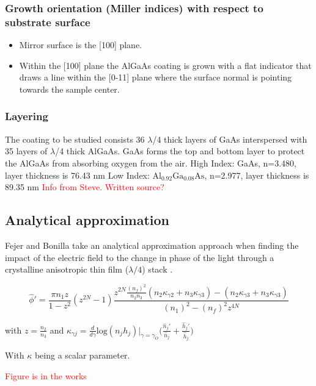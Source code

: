\subsubsection{Growth orientation (Miller indices) with respect to substrate surface}
\begin{itemize}
\item Mirror surface is the [100] plane.
\item Within the [100] plane the AlGaAs coating is grown with a flat indicator that draws a line within the [0-11] plane where the surface normal is pointing towards the sample center.
\end{itemize}


\subsubsection{Layering}
The coating to be studied consists 36 $\lambda$/4  thick layers of GaAs interspersed with 35 layers of $\lambda$/4 thick AlGaAs.   GaAs forms the top and bottom layer to protect the AlGaAs from absorbing oxygen from the air.
High Index:  GaAs, n=3.480, layer thickness is 76.43 nm
Low Index:  $ \mathrm{Al}_{0.92} \mathrm{Ga}_{0.08} \mathrm{As} $, n=2.977, layer thickness is 89.35 nm
\textcolor{red}{Info from Steve. Written source?}


\subsection{Analytical approximation}
Fejer and Bonilla take an analytical approximation approach when finding the impact of the electric field to the change in phase of the light through a crystalline anisotropic thin film ($\lambda/4$) stack \cite{bonilla_fejer}.

\begin{equation}
\hat{\phi}' = \frac{\pi n_1 z}{1-z^2}(z^{2N} -1) \frac{z^{2N} \frac{(n_f)^2}{n_2 n_3}(n_2 \kappa_{\gamma 2} + n_3\kappa_{\gamma 3}) - (n_2 \kappa_{\gamma 3} + n_3\kappa_{\gamma 3})}{(n_1)^2 -(n_f)^2 z^{4N}}
\end{equation}

with $z = \frac{n_2}{n_3}$
and
$
\kappa_{\gamma j} = \frac{d}{d \gamma} \mathrm{log}(n_j h_j)|_{\gamma =\gamma_{O}} \bigg(\frac{\hat{n}_j'}{\hat{n}_j} +\frac{\hat{h}_j'}{\hat{h}_j} \bigg)
$

With $\kappa$ being a scalar parameter.


\textcolor{red}{Figure is in the works}

